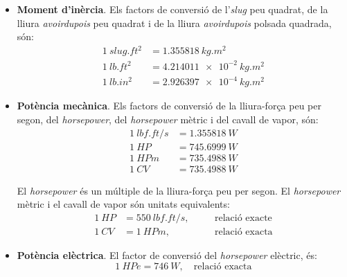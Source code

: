 \begin{itemize}
    \item \textbf{Moment d'inèrcia}. Els factors de conversió de l'\textit{slug} peu quadrat, de la lliura \textit{avoirdupois} peu quadrat   i de la lliura \textit{avoirdupois} polsada quadrada, són:
    \begin{subequations}
    \begin{align}
        \qty{1}{slug.ft^2} &= \qty{1,355818}{kg.m^2} \\
        \qty{1}{lb.ft^2} &= \qty{4,214011e-2}{kg.m^2} \\
        \qty{1}{lb.in^2} &= \qty{2,926397e-4}{kg.m^2}
    \end{align}
    \end{subequations}

    \item \textbf{Potència mecànica}. Els factors de conversió de la lliura-força peu per segon, del \textit{horsepower},  del \textit{horsepower} mètric i del cavall de vapor, són:
    \begin{subequations}
    \begin{align}
      \qty{1}{lbf.ft/s} &= \qty{1,355818}{W} \\
      \qty{1}{HP} &= \qty{745,6999}{W} \\
      \qty{1}{HPm} &= \qty{735,4988}{W} \\
      \qty{1}{CV} &= \qty{735,4988}{W}
    \end{align}
    \end{subequations}

    El \textit{horsepower} és un múltiple  de la lliura-força peu per segon. El \textit{horsepower} mètric i el cavall de vapor són unitats equivalents:
    \begin{subequations}
    \begin{alignat}{3}
      \qty{1}{HP} &= \qty{550}{lbf.ft/s},  &&\quad\text{relació exacte} \\
      \qty{1}{CV} &= \qty{1}{HPm}, &&\quad\text{relació exacta}
    \end{alignat}
    \end{subequations}


    \item \textbf{Potència elèctrica}. El factor de conversió del
    \textit{horsepower} elèctric, és:
    \begin{equation}
        \qty{1}{HPe} = \qty{746}{W},\quad\text{relació exacta}
    \end{equation}
  \end{itemize}


